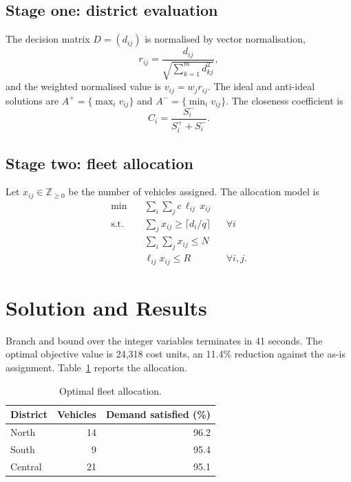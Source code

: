\documentclass[10pt]{article}
\begin{document}
\subsection{Stage one: district evaluation}

The decision matrix $D=(d_{ij})$ is normalised by vector normalisation,
\begin{equation}
  r_{ij} = \frac{d_{ij}}{\sqrt{\sum_{k=1}^{m} d_{kj}^2}},
\end{equation}
and the weighted normalised value is $v_{ij} = w_j r_{ij}$. The ideal and
anti-ideal solutions are $A^{+} = \{\max_i v_{ij}\}$ and
$A^{-} = \{\min_i v_{ij}\}$. The closeness coefficient is
\begin{equation}
  C_i = \frac{S_i^{-}}{S_i^{+} + S_i^{-}} .
\end{equation}

\subsection{Stage two: fleet allocation}

Let $x_{ij} \in \mathbb{Z}_{\ge 0}$ be the number of vehicles assigned. The
allocation model is
\begin{align}
  \min \quad & \sum_{i}\sum_{j} c \, \ell_{ij} \, x_{ij} \\
  \text{s.t.} \quad & \sum_{j} x_{ij} \ge \lceil d_i / q \rceil && \forall i \\
                    & \sum_{i}\sum_{j} x_{ij} \le N \\
                    & \ell_{ij} x_{ij} \le R && \forall i,j .
\end{align}

\section{Solution and Results}

Branch and bound over the integer variables terminates in 41 seconds. The optimal
objective value is 24{,}318 cost units, an 11.4\% reduction against the
as-is assignment. Table~\ref{tab:alloc} reports the allocation.

\begin{table}[h]
\centering
\caption{Optimal fleet allocation.}
\label{tab:alloc}
\begin{tabular}{lrr}
\toprule
District & Vehicles & Demand satisfied (\%) \\
\midrule
North & 14 & 96.2 \\
South & 9  & 95.4 \\
Central & 21 & 95.1 \\
\bottomrule
\end{tabular}
\end{table}
\end{document}
